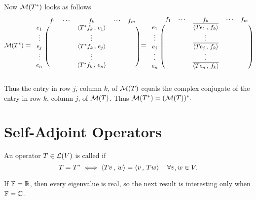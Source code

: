 \begin{prf}
  Now $\mathcal{M}(T^*)$ looks as follows
  \[
  \mmatrix(T^*)
  \;\mathlarger{=}\;
  \begin{blockarray}{cccccc}
    & f_1 & \cdots &  f_k      & \cdots & f_m \\
    \begin{block}{c(ccccc)}
      e_1    &  &  & \ip{T^* f_k}{e_1} & & \\
      \vdots &  &  & \vdots            & & \\
      e_j    &  &  & \ip{T^* f_k}{e_j} & & \\
      \vdots &  &  & \vdots            & & \\
      e_n    &  &  & \ip{T^* f_k}{e_n} & & \\
    \end{block}
  \end{blockarray}
  \;\mathlarger{=}\;
  \begin{blockarray}{cccccc}
    & f_1 & \cdots &  f_k      & \cdots & f_m \\
    \begin{block}{c(ccccc)}
      e_1    &  &  & \overline{\ip{T e_1}{f_k}} & & \\
      \vdots &  &  & \vdots            & & \\
      e_j    &  &  & \overline{\ip{T e_j}{f_k}} & & \\
      \vdots &  &  & \vdots            & & \\
      e_n    &  &  & \overline{\ip{T e_n}{f_k}} & & \\
    \end{block}
  \end{blockarray}
  \]


  Thus the entry in row $j$, column $k$, of $\mathcal{M}(T)$ equals the complex conjugate of the entry in row $k$, column $j$, of $\mathcal{M}(T)$. Thus
    $\mathcal{M}(T^*) = (\mathcal{M}(T))^*.$
\end{prf}

\section{Self-Adjoint Operators}

\begin{mydef}
  An operator $T \in \mathcal{L}(V)$ is called  if
  \[
    T = T^* \iff \left \langle Tv \, , \, w \right \rangle = \left \langle v \, , \, Tw \right \rangle \quad \forall v,w \in V.
  \]
\end{mydef}

If $\mathbb{F} = \mathbb{R}$, then every eigenvalue is real, so the next result is interesting only when $\mathbb{F} = \mathbb{C}$.

